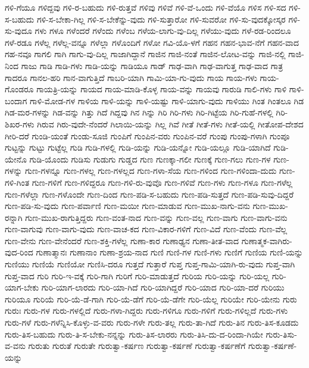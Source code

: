 {ಗಳಿ-ಗೆಯೂ
ಗಳಿದ್ದವು
ಗಳಿ-ರ-ಬಹುದು
ಗಳಿ-ರುತ್ತವೆ
ಗಳಿವು
ಗಳಿವೆ
ಗಳಿ-ವೆ-ಒಂದು
ಗಳಿ-ವೆಯೊ
ಗಳಿಸ
ಗಳಿ-ಸದ
ಗಳಿ-ಸ-ಬಹುದು
ಗಳಿ-ಸ-ಬೇಕಾ-ಗಿಲ್ಲ
ಗಳಿ-ಸ-ಬೇಕೆನ್ನು-ವುದು
ಗಳಿ-ಸುತ್ತಾರೋ
ಗಳಿ-ಸುವರೋ
ಗಳಿ-ಸು-ವುದಕ್ಕೋಸ್ಕರ
ಗಳಿ-ಸು-ವುದೂ
ಗಳು
ಗಳೂ
ಗಳೆಂದರೆ
ಗಳೆಂದು
ಗಳೆಂಬ
ಗಳೆಯ-ಲಾಗು-ವು-ದಿಲ್ಲ
ಗಳೆಯು-ವುದು
ಗಳೆ-ರಡ-ರಿಂದಲೂ
ಗಳೆ-ರಡೂ
ಗಳೆಲ್ಲ
ಗಳೆಲ್ಲ-ವನ್ನೂ
ಗಳೆಲ್ಲಾ
ಗಳೊಂದಿಗೆ
ಗಳೋ
ಗವಿ-ಯೊ-ಳಗೆ
ಗಹನ
ಗಹನ-ಭಾವ-ನೆಗೆ
ಗಹನ-ವಾದ
ಗಹ-ನವೂ
ಗಾಗಲಿ
ಗಾಗಿ
ಗಾಗು-ವು-ದಿಲ್ಲ
ಗಾಜಾಗಿದ್ದಾನೆ
ಗಾಜಿನ
ಗಾಜಿ-ನಂತೆ
ಗಾಜಿನ-ಲೋಟ-ವನ್ನು
ಗಾಜಿ-ನಲ್ಲಿ
ಗಾಜಿ-ನಿಂದ
ಗಾಜು
ಗಾಡಿ
ಗಾಡಿ-ಗಳು
ಗಾಡಿ-ಯನ್ನು
ಗಾಡಿಯೂ
ಗಾಡ್
ಗಾಢ-ವಾಗಿ
ಗಾಢ-ವಾಗುತ್ತ
ಗಾಢ-ವಾದ
ಗಾತ್ರ
ಗಾದರೂ
ಗಾನಲ-ಹರಿ
ಗಾನ-ವಾಗುತ್ತಿದೆ
ಗಾಬರಿ-ಯಾಗಿ
ಗಾಮಿ-ಯಾ-ಗು-ವುದು
ಗಾಯ
ಗಾಯ-ಗಳು
ಗಾಯ-ಗೊಂಡರೂ
ಗಾಯತ್ರಿ-ಯನ್ನು
ಗಾಯದ
ಗಾಯ-ಮಾಡಿ-ಕೊಳ್ಳ
ಗಾಯ-ವನ್ನು
ಗಾಯವು
ಗಾರುಡಿ
ಗಾಲಿ-ಗಳು
ಗಾಳಿ
ಗಾಳಿ-ಬಂದಾಗ
ಗಾಳಿ-ಮೋಡ-ಗಳ
ಗಾಳಿಯ
ಗಾಳಿ-ಯನ್ನು
ಗಾಳಿ-ಯಷ್ಟು
ಗಾಳಿ-ಯಾಗು-ವುದು
ಗಾಳಿಯು
ಗಿಂತ
ಗಿಂತಲೂ
ಗಿಡ
ಗಿಡ-ಮರ-ಗಳನ್ನು
ಗಿಡ-ವನ್ನು
ಗಿತ್ತು
ಗಿದೆ
ಗಿದ್ದವು
ಗಿನ
ಗಿನ್ನು
ಗಿರಿ
ಗಿರಿ-ಗಳು
ಗಿರಿ-ಗಿಟ್ಟೆಯ
ಗಿರಿ-ಗುಹೆ-ಗಳಲ್ಲಿ
ಗಿರಿ-ಶಿಖರ-ಗಳು
ಗಿರುವ
ಗಿರು-ವುದೇ-ನೆಂದರೆ
ಗಿಲಾಯಿ-ಯನ್ನು
ಗಿಲ್ಲ
ಗಿವೆ
ಗೀತೆ
ಗೀತೆ-ಗಳು
ಗೀತೆ-ಯಲ್ಲಿ
ಗೀತೋಪ-ದೇಶದ
ಗೀರಿ-ದರೆ
ಗುಂಡಿ-ಯಂತೆ
ಗುಂಡು-ಸೂಜಿ
ಗುಂಪಿಗೆ
ಗುಂಪಿನ-ವರು
ಗುಂಪಿನ-ವರೆ
ಗುಂಪು
ಗುಂಪು-ಗಳಾಗಿ
ಗುಂಪೂ
ಗುಟ್ಟನ್ನು
ಗುಟ್ಟು
ಗುಟ್ಟೆಲ್ಲ
ಗುಡಿ
ಗುಡಿ-ಗಳಲ್ಲಿ
ಗುಡಿ-ಯನ್ನು
ಗುಡಿ-ಯನ್ನೋ
ಗುಡಿ-ಯಲ್ಲೂ
ಗುಡಿ-ಯಾಗಿದೆ
ಗುಡಿ-ಯೇನೊ
ಗುಡಿ-ಯೊಂದು
ಗುಡಿಸು
ಗುಡುಗು
ಗುಡ್ಡದ
ಗುಣ
ಗುಣಕ್ಕಾ-ಗಲೀ
ಗುಣಕ್ಕೆ
ಗುಣ-ಗಲು
ಗುಣ-ಗಳ
ಗುಣ-ಗಳನ್ನು
ಗುಣ-ಗಳನ್ನೂ
ಗುಣ-ಗಳಲ್ಲ
ಗುಣ-ಗಳಲ್ಲದ
ಗುಣ-ಗಳಾ-ಸೆಯ
ಗುಣ-ಗಳಿಂದ
ಗುಣ-ಗಳಿಂದಾ-ದುದು
ಗುಣ-ಗಳಿ-ಗಿಂತ
ಗುಣ-ಗಳಿಗೆ
ಗುಣ-ಗಳಿದ್ದರೂ
ಗುಣ-ಗಳಿ-ರು-ವುವೊ
ಗುಣ-ಗಳಿವೆ
ಗುಣ-ಗಳು
ಗುಣ-ಗಳೂ
ಗುಣ-ಗಳೆಲ್ಲ
ಗುಣ-ಗಳೆಲ್ಲಾ
ಗುಣ-ಗಳೊಂದೇ
ಗುಣ-ದಿಂದ
ಗುಣ-ಪಡಿ-ಸ-ಬಹುದು
ಗುಣ-ಪಡಿ-ಸುತ್ತದೆ
ಗುಣ-ಪಡಿ-ಸುವು-ದಿದ್ದರೆ
ಗುಣ-ಪಡಿ-ಸು-ವುದು
ಗುಣ-ಪರ್ವಾಣಿ
ಗುಣ-ಮಯೀ
ಗುಣ-ಮಾಡುವ
ಗುಣ-ಮುಖ-ನಾಗು-ವನು
ಗುಣ-ಮುಖ-ರನ್ನಾಗಿ
ಗುಣ-ಮುಖ-ರಾಗುತ್ತಿದ್ದರು
ಗುಣ-ವಂತ-ನಾದ
ಗುಣ-ವನ್ನು
ಗುಣ-ವಲ್ಲ
ಗುಣ-ವಾಗು
ಗುಣ-ವಾಗು-ವನು
ಗುಣ-ವಾಗುವು
ಗುಣ-ವಾಗು-ವುದು
ಗುಣ-ವಾಚ-ಕದ
ಗುಣ-ವಿಕಾರ-ಗಳಿಗೆ
ಗುಣ-ವಿದೆ
ಗುಣ-ವೆಂದು
ಗುಣ-ವೆಲ್ಲ
ಗುಣ-ವೇನು
ಗುಣ-ವೇನೆಂದರೆ
ಗುಣ-ಶಕ್ತಿ-ಗಳೆಲ್ಲ
ಗುಣಾ-ಕಾರ
ಗುಣಾಢ್ಯನ
ಗುಣಾ-ತೀತ-ವಾದ
ಗುಣಾತ್ಮಕ-ವಾಗಿರು-ವುದ-ರಿಂದ
ಗುಣಾತ್ಮಾನಃ
ಗುಣಾನಾಂ
ಗುಣಾ-ಶ್ರಯ-ನಾದ
ಗುಣಿ
ಗುಣಿ-ಗಳ
ಗುಣಿ-ಗಳು
ಗುಣಿಗೆ
ಗುಣಿಯ
ಗುಣಿ-ಯನ್ನು
ಗುಣಿಯು
ಗುಣಿಯೆ
ಗುಣಿಯೋ
ಗುಣಿಸಿ-ದರೂ
ಗುತ್ತದೆ
ಗುತ್ತಾರೆ
ಗುಪ್ತ
ಗುಪ್ತ-ಗಾಮಿ-ಯಾಗಿ-ರು-ವುದು
ಗುಪ್ತ-ವಾಗಿ
ಗುಪ್ತ-ವಾದ
ಗುರಿ
ಗುರಿ-ಇ-ವಕ್ಕೆ
ಗುರಿ-ಗಾಗಿ
ಗುರಿಗೆ
ಗುರಿ-ಮಾಡುತ್ತದೆ
ಗುರಿಯ
ಗುರಿ-ಯನ್ನು
ಗುರಿ-ಯಲ್ಲ
ಗುರಿ-ಯಾಗ-ಬೇಕು
ಗುರಿ-ಯಾಗ-ಲಾರದು
ಗುರಿ-ಯಾ-ಗಿದೆ
ಗುರಿ-ಯಾಗಿದ್ದರೆ
ಗುರಿ-ಯಾದ
ಗುರಿ-ಯಾ-ದರೆ
ಗುರಿಯು
ಗುರಿಯೂ
ಗುರಿಯೆ
ಗುರಿ-ಯೆ-ಡೆ-ಗಾಗಿ
ಗುರಿ-ಯೆ-ಡೆಗೆ
ಗುರಿ-ಯೆ-ಡೆಗೇ
ಗುರಿ-ಯೆಲ್ಲ
ಗುರಿಯೇ
ಗುರಿ-ಯೇನು
ಗುರು
ಗುರುಃ
ಗುರು-ಗಳ
ಗುರು-ಗಳಲ್ಲಿದೆ
ಗುರು-ಗಳಾ-ಗಿದ್ದರು
ಗುರು-ಗಳಿಗೂ
ಗುರು-ಗಳಿಗೆ
ಗುರು-ಗಳಿಲ್ಲದೆ
ಗುರು-ಗಳು
ಗುರು-ಗಳೆ
ಗುರು-ಗಳೆನ್ನಿಸಿ-ಕೊಳ್ಳು-ವ-ವರು
ಗುರು-ಗಳೇ
ಗುರು-ತಲ್ಲ
ಗುರು-ತಾ-ಗಿದೆ
ಗುರು-ತಿನ
ಗುರು-ತಿಸ-ಕೂಡದು
ಗುರು-ತಿಸ-ಬಹುದು
ಗುರು-ತಿ-ಸ-ಬೇಕು-ನನ್ನನ್ನು
ಗುರು-ತಿಸ-ಲಾರರು
ಗುರು-ತಿಸಿ-ದು-ದ-ರಿಂದಾ-ಗಿಯೇ
ಗುರು-ತಿಸು-ವ-ವನು
ಗುರುತು
ಗುರುತೆ
ಗುರುತೇ
ಗುರುತ್ವಾ-ಕರ್ಷಣ
ಗುರುತ್ವಾ-ಕರ್ಷಣೆ
ಗುರುತ್ವಾ-ಕರ್ಷಣೆಗೆ
ಗುರುತ್ವಾ-ಕರ್ಷಣೆ-ಯನ್ನು
}
